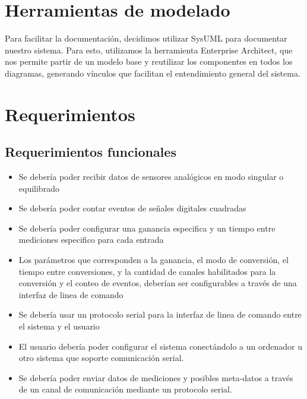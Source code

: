 
\section{Herramientas de modelado} %
\label{sec:herramientas_de_modelado}

Para facilitar la documentación, decidimos utilizar SysUML para documentar nuestro sistema. Para esto, utilizamos la herramienta Enterprise Architect, que nos permite partir de un modelo base y reutilizar los componentes en todos los diagramas, generando vínculos que facilitan el entendimiento general del sistema.


\section{Requerimientos} %
\label{sec:requerimientos}

\subsection{Requerimientos funcionales} %
\label{sub:requerimientos_funcionales}

\begin{itemize}
	\item Se debería poder recibir datos de sensores analógicos en modo singular o equilibrado
	\item Se debería poder contar eventos de señales digitales cuadradas
	\item Se debería poder configurar una ganancia especifica y un tiempo entre mediciones especifico para cada entrada
	\item Los parámetros que corresponden a la ganancia, el modo de conversión, el tiempo entre conversiones, y la cantidad de canales habilitados para la conversión y el conteo de eventos, deberían ser configurables a través de una interfaz de linea de comando
	\item Se debería usar un protocolo serial para la interfaz de linea de comando entre el sistema y el usuario
	\item El usuario debería poder configurar el sistema conectándolo a un ordenador u otro sistema que soporte comunicación serial.
	\item Se debería poder enviar datos de mediciones y posibles meta-datos a través de un canal de comunicación mediante un protocolo serial.
\end{itemize}

